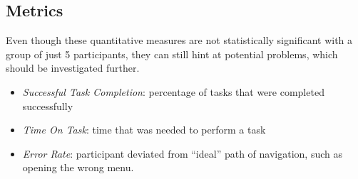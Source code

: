 



\subsection{Metrics}
Even though these quantitative measures are not statistically significant with a group of just 5 participants, they can still hint at potential problems, which should be investigated further.


\begin{itemize}
  \item \emph{Successful Task Completion}: percentage of tasks that were completed successfully
  \item \emph{Time On Task}: time that was needed to perform a task
  \item \emph{Error Rate}: participant deviated from “ideal” path of navigation, such as opening the wrong menu.
\end{itemize}

